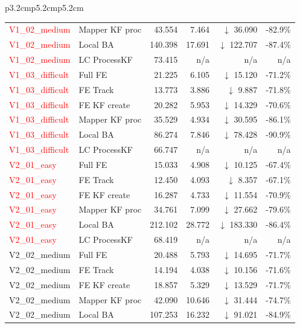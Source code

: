 \documentclass[11pt]{article}
\begin{document}
\begin{table}[ht]
\begin{tabular}{p{3.2cm}p{5.2cm}p{5.2cm}}
\begin{longtable}{llrrrr}
\textcolor{red}{V1\_02\_medium} & Mapper KF proc & 43.554 & 7.464 & $\downarrow$ 36.090 & -82.9\% \\
\textcolor{red}{V1\_02\_medium} & Local BA & 140.398 & 17.691 & $\downarrow$ 122.707 & -87.4\% \\
\textcolor{red}{V1\_02\_medium} & LC ProcessKF & 73.415 & n/a & n/a & n/a \\
\textcolor{red}{V1\_03\_difficult} & Full FE & 21.225 & 6.105 & $\downarrow$ 15.120 & -71.2\% \\
\textcolor{red}{V1\_03\_difficult} & FE Track & 13.773 & 3.886 & $\downarrow$ 9.887 & -71.8\% \\
\textcolor{red}{V1\_03\_difficult} & FE KF create & 20.282 & 5.953 & $\downarrow$ 14.329 & -70.6\% \\
\textcolor{red}{V1\_03\_difficult} & Mapper KF proc & 35.529 & 4.934 & $\downarrow$ 30.595 & -86.1\% \\
\textcolor{red}{V1\_03\_difficult} & Local BA & 86.274 & 7.846 & $\downarrow$ 78.428 & -90.9\% \\
\textcolor{red}{V1\_03\_difficult} & LC ProcessKF & 66.747 & n/a & n/a & n/a \\
\textcolor{red}{V2\_01\_easy} & Full FE & 15.033 & 4.908 & $\downarrow$ 10.125 & -67.4\% \\
\textcolor{red}{V2\_01\_easy} & FE Track & 12.450 & 4.093 & $\downarrow$ 8.357 & -67.1\% \\
\textcolor{red}{V2\_01\_easy} & FE KF create & 16.287 & 4.733 & $\downarrow$ 11.554 & -70.9\% \\
\textcolor{red}{V2\_01\_easy} & Mapper KF proc & 34.761 & 7.099 & $\downarrow$ 27.662 & -79.6\% \\
\textcolor{red}{V2\_01\_easy} & Local BA & 212.102 & 28.772 & $\downarrow$ 183.330 & -86.4\% \\
\textcolor{red}{V2\_01\_easy} & LC ProcessKF & 68.419 & n/a & n/a & n/a \\
V2\_02\_medium & Full FE & 20.488 & 5.793 & $\downarrow$ 14.695 & -71.7\% \\
V2\_02\_medium & FE Track & 14.194 & 4.038 & $\downarrow$ 10.156 & -71.6\% \\
V2\_02\_medium & FE KF create & 18.857 & 5.329 & $\downarrow$ 13.529 & -71.7\% \\
V2\_02\_medium & Mapper KF proc & 42.090 & 10.646 & $\downarrow$ 31.444 & -74.7\% \\
V2\_02\_medium & Local BA & 107.253 & 16.232 & $\downarrow$ 91.021 & -84.9\% \\

\end{longtable}
\end{tabular}
\end{table}
\end{document}
